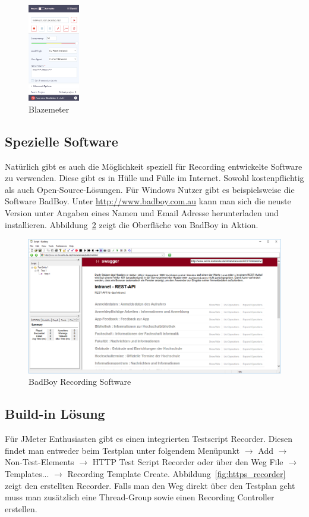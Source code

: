 \documentclass[a4paper,12pt]{article}
\begin{document}
\begin{figure}[htb]%
 \centering
    \includegraphics[width=0.2\textwidth]{bilder/blazemeter.png}
  \caption{Blazemeter}
  \label{fig:blazemeter}
\end{figure}

\subsection{Spezielle Software}
Natürlich gibt es auch die Möglichkeit speziell für Recording entwickelte Software zu verwenden. Diese gibt es in Hülle und Fülle im Internet. Sowohl kostenpflichtig als auch Open-Source-Lösungen. Für Windows Nutzer gibt es beispielsweise die Software BadBoy. Unter \url{http://www.badboy.com.au} kann man sich die neuste Version unter Angaben eines Namen und Email Adresse herunterladen und installieren. Abbildung~\ref{fig:badboy} zeigt die Oberfläche von BadBoy in Aktion. 

\begin{figure}[htb]%
 \centering
    \includegraphics[width=1\textwidth]{bilder/badboy.png}
  \caption{BadBoy Recording Software}
  \label{fig:badboy}
\end{figure}

\subsection{Build-in Lösung}
Für JMeter Enthusiasten gibt es einen integrierten Testscript Recorder. Diesen findet man entweder beim Testplan unter folgendem Menüpunkt $\rightarrow$ Add $\rightarrow$ Non-Test-Elements $\rightarrow$ HTTP Test Script Recorder oder über den Weg File $\rightarrow$ Templates... $\rightarrow$ Recording Template Create.
Abbildung~\ref{fig:https_recorder} zeigt den erstellten Recorder. Falls man den Weg direkt über den Testplan geht muss man zusätzlich eine Thread-Group sowie einen Recording Controller erstellen.
\end{document}
